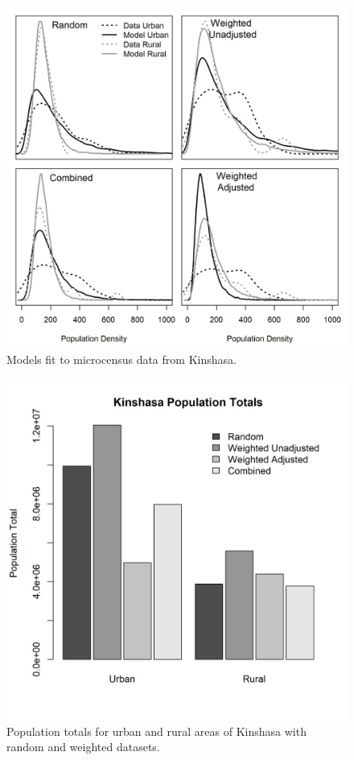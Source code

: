 \documentclass[9pt,twocolumn,twoside,lineno]{pnas-new}
\begin{document}
\begin{figure}
	\centering
	\includegraphics[width=1\linewidth]{drc_model.jpg}
	\caption{Models fit to microcensus data from Kinshasa.}
	\label{fig:drc_model}
\end{figure}

\begin{figure}
	\centering
	\includegraphics[width=1\linewidth]{drc_totals.jpg}
	\caption{Population totals for urban and rural areas of Kinshasa with random and weighted datasets.}
	\label{fig:drc_totals}
\end{figure}
\end{document}
